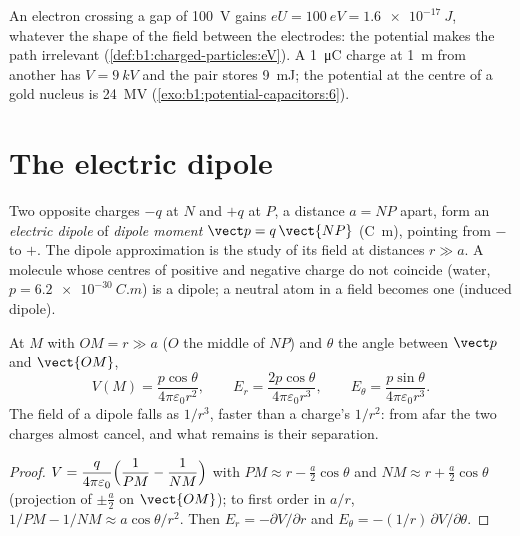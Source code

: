 \begin{example}\label{ex:b1:potential-capacitors:eV}
An electron crossing a gap of \qty{100}{V} gains $eU = \qty{100}{eV} =
\qty{1.6e-17}{J}$, whatever the shape of the field between the
electrodes: the potential makes the path irrelevant
(\cref{def:b1:charged-particles:eV}). A \qty{1}{\micro C} charge at
\qty{1}{m} from another has $V = \qty{9}{kV}$ and the pair stores
\qty{9}{mJ}; the potential at the centre of a gold nucleus is
\qty{24}{MV} (\cref{exo:b1:potential-capacitors:6}).
\end{example}

\section{The electric dipole}

\begin{definition}\label{def:b1:potential-capacitors:dipole}
Two opposite charges $-q$ at $N$ and $+q$ at $P$, a distance $a = NP$
apart, form an \emph{electric dipole} of \emph{dipole moment}
$\vect p = q\,\vect{NP}$ (\unit{C.m}), pointing from $-$ to $+$. The dipole
approximation is the study of its field at distances $r \gg a$. A
molecule whose centres of positive and negative charge do not coincide
(water, $p = \qty{6.2e-30}{C.m}$) is a dipole; a neutral atom in a field
becomes one (induced dipole).
\end{definition}

\begin{proposition}\label{prop:b1:potential-capacitors:dipolefield}
At $M$ with $OM = r \gg a$ ($O$ the middle of $NP$) and $\theta$ the
angle between $\vect p$ and $\vect{OM}$,
\[
V(M) = \frac{p\cos\theta}{4\pi\varepsilon_0 r^2}, \qquad
E_r = \frac{2p\cos\theta}{4\pi\varepsilon_0r^3}, \qquad
E_\theta = \frac{p\sin\theta}{4\pi\varepsilon_0r^3} .
\]
The field of a dipole falls as $1/r^3$, faster than a charge's
$1/r^2$: from afar the two charges almost cancel, and what remains is
their separation.
\end{proposition}

\begin{proof}
$V = \dfrac{q}{4\pi\varepsilon_0}\Bigl(\dfrac1{PM} - \dfrac1{NM}\Bigr)$ with
$PM \approx r - \tfrac a2\cos\theta$ and $NM \approx r + \tfrac a2\cos\theta$
(projection of $\pm\tfrac a2$ on $\vect{OM}$); to first order in $a/r$,
$1/PM - 1/NM \approx a\cos\theta/r^2$. Then $E_r = -\partial V/\partial r$ and
$E_\theta = -(1/r)\,\partial V/\partial\theta$.
\end{proof}

